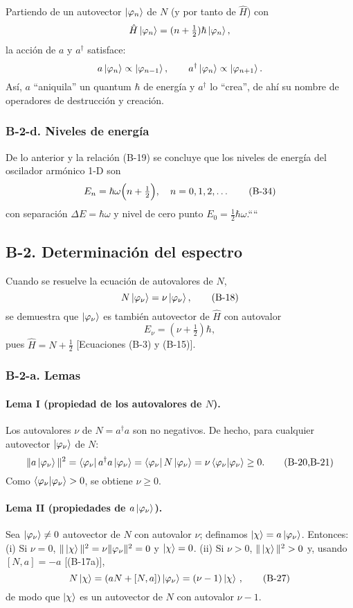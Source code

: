 \documentclass[a4paper,11pt]{article}
\begin{document}
Partiendo de un autovector \(\ket{\varphi_n}\) de \(N\) (y por tanto de \(\hat H\)) con  
\[
\hat H\ket{\varphi_n}=(n+\tfrac12)\hbar\ket{\varphi_n},
\]
la acción de \(a\) y \(a^\dagger\) satisface:
\[
a\ket{\varphi_n}\propto\ket{\varphi_{n-1}},\qquad
a^\dagger\ket{\varphi_n}\propto\ket{\varphi_{n+1}}.
\]
Así, \(a\) “aniquila” un quantum \(\hbar\) de energía y \(a^\dagger\) lo “crea”, de ahí su nombre de operadores de destrucción y creación.

\subsubsection*{B-2-d. Niveles de energía}

De lo anterior y la relación (B-19) se concluye que los niveles de energía del oscilador armónico 1-D son
\[
E_n=\hbar\omega\Bigl(n+\tfrac12\Bigr),
\quad n=0,1,2,\dots
\tag{B-34}
\]
con separación \(\Delta E=\hbar\omega\) y nivel de cero punto \(E_0=\tfrac12\hbar\omega\).````\subsection*{B-2. Determinación del espectro}

Cuando se resuelve la ecuación de autovalores de \(N\),
\[
N\ket{\varphi_\nu}=\nu\ket{\varphi_\nu},
\tag{B-18}
\]
se demuestra que \(\ket{\varphi_\nu}\) es también autovector de \(\hat H\) con autovalor
\[
E_\nu=(\nu+\tfrac12)\hbar,
\tag{B-19}
\]
pues \(\hat H=N+\tfrac12\) [Ecuaciones (B-3) y (B-15)].

\subsubsection*{B-2-a. Lemas}

\paragraph{Lema I (propiedad de los autovalores de \(N\)).}  
Los autovalores \(\nu\) de \(N=a^\dagger a\) son no negativos.  
De hecho, para cualquier autovector \(\ket{\varphi_\nu}\) de \(N\):
\[
\|a\ket{\varphi_\nu}\|^2
=\bra{\varphi_\nu}a^\dagger a\ket{\varphi_\nu}
=\bra{\varphi_\nu}N\ket{\varphi_\nu}
=\nu\braket{\varphi_\nu|\varphi_\nu}\ge0.
\tag{B-20,B-21}
\]
Como \(\braket{\varphi_\nu|\varphi_\nu}>0\), se obtiene \(\nu\ge0\).
  
\paragraph{Lema II (propiedades de \(a\ket{\varphi_\nu}\)).}  
Sea \(\ket{\varphi_\nu}\ne0\) autovector de \(N\) con autovalor \(\nu\); definamos  
\(\ket{\chi}=a\ket{\varphi_\nu}\). Entonces:  
(i) Si \(\nu=0\), \(\|\ket{\chi}\|^2=\nu\|\varphi_\nu\|^2=0\) y \(\ket{\chi}=0\).  
(ii) Si \(\nu>0\), \(\|\ket{\chi}\|^2>0\) y, usando \([N,a]=-a\) [(B-17a)],
\[
N\ket{\chi}=(aN+[N,a])\ket{\varphi_\nu}
=(\nu-1)\ket{\chi}\,,
\tag{B-27}
\]
de modo que \(\ket{\chi}\) es un autovector de \(N\) con autovalor \(\nu-1\).
\end{document}
